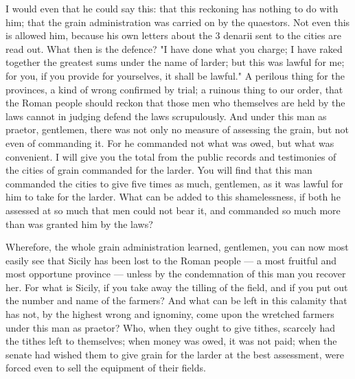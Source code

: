  I would even that he could say this: that this reckoning has nothing to do with him; that the grain administration was carried on by the quaestors. Not even this is allowed him, because his own letters about the 3 denarii sent to the cities are read out. What then is the defence? "I have done what you charge; I have raked together the greatest sums under the name of larder; but this was lawful for me; for you, if you provide for yourselves, it shall be lawful." A perilous thing for the provinces, a kind of wrong confirmed by trial; a ruinous thing to our order, that the Roman people should reckon that those men who themselves are held by the laws cannot in judging defend the laws scrupulously. And under this man as praetor, gentlemen, there was not only no measure of assessing the grain, but not even of commanding it. For he commanded not what was owed, but what was convenient. I will give you the total from the public records and testimonies of the cities of grain commanded for the larder. You will find that this man commanded the cities to give five times as much, gentlemen, as it was lawful for him to take for the larder. What can be added to this shamelessness, if both he assessed at so much that men could not bear it, and commanded so much more than was granted him by the laws?

 Wherefore, the whole grain administration learned, gentlemen, you can now most easily see that Sicily has been lost to the Roman people --- a most fruitful and most opportune province --- unless by the condemnation of this man you recover her. For what is Sicily, if you take away the tilling of the field, and if you put out the number and name of the farmers? And what can be left in this calamity that has not, by the highest wrong and ignominy, come upon the wretched farmers under this man as praetor? Who, when they ought to give tithes, scarcely had the tithes left to themselves; when money was owed, it was not paid; when the senate had wished them to give grain for the larder at the best assessment, were forced even to sell the equipment of their fields.

